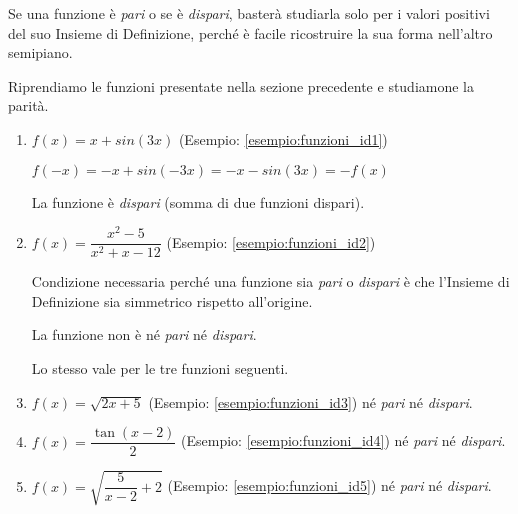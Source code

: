 \begin{osservazione}
Se una funzione è \emph{pari} o se è \emph{dispari}, basterà studiarla 
solo per i valori positivi del suo Insieme di Definizione, 
perché è facile ricostruire la sua forma nell'altro semipiano.
\end{osservazione}

\begin{esempio}
Riprendiamo le funzioni presentate nella sezione precedente e studiamone la 
parità.
\begin{enumerate}
\item \(f(x) = x +sin(3x)\) \quad (Esempio: \ref{esempio:funzioni_id1})

\(f(-x) = -x +sin(-3x) = -x -sin(3x) = -f(x)\)

La funzione è \emph{dispari} (somma di due funzioni dispari).

\item \(f(x) = \dfrac{x^2 -5}{x^2 +x -12}\) \quad 
(Esempio: \ref{esempio:funzioni_id2})

Condizione necessaria perché una funzione sia \emph{pari} o \emph{dispari} 
è che l'Insieme di Definizione sia simmetrico rispetto all'origine. 

La funzione non è né \emph{pari} né \emph{dispari}.

Lo stesso vale per le tre funzioni seguenti.

\item \(f(x) = \sqrt{2x +5}\) \quad 
(Esempio: \ref{esempio:funzioni_id3}) \quad né \emph{pari} né \emph{dispari}.

\item \(f(x) = \dfrac{\tan(x -2)}{2}\) \quad 
(Esempio: \ref{esempio:funzioni_id4}) \quad né \emph{pari} né \emph{dispari}.

\item \(f(x) = \sqrt{\dfrac{5}{x-2}+2}\) \quad 
(Esempio: \ref{esempio:funzioni_id5}) \quad né \emph{pari} né \emph{dispari}.
\end{enumerate}

\end{esempio}


